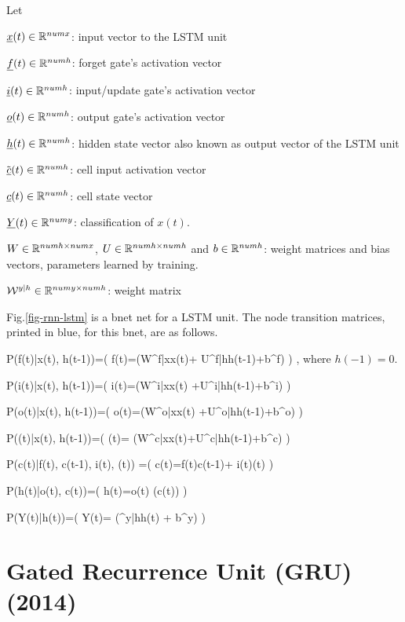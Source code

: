 Let

${\underline{x}}(t)\in { \mathbb{R}}^{numx}$: 
input vector to the LSTM unit

${\underline{f}}(t)\in { \mathbb{R}}^{numh}$:
forget gate's activation vector

${\underline{i}}(t)\in { \mathbb{R}}^{numh}$: 
input/update gate's activation vector

${\underline{o}}(t)\in { \mathbb{R}}^{numh}$: 
output gate's activation vector

${\underline{h}}(t)\in { \mathbb{R}}^{numh}$: 
hidden state vector also known as
 output vector of the LSTM unit

${\tilde {{\underline{c}}}}(t)\in { \mathbb{R}}^{numh}$: 
cell input activation vector

${\underline{c}}(t)\in { \mathbb{R}}^{numh}$: 
cell state vector

${\underline{Y}}(t)\in { \mathbb{R}}^{numy}$: 
classification of $x(t)$.

$W\in { \mathbb{R}}^{numh\times numx}$, 
$U\in { \mathbb{R}}^{numh\times numh}$
and 
$b\in { \mathbb{R}}^{numh}$: 
weight matrices and bias vectors,
 parameters learned by training.

${\cal W}^{y|h}\in { \mathbb{R}}^{numy\times numh}$:
 weight matrix


Fig.\ref{fig-rnn-lstm}
is a bnet net
for a LSTM unit.
The node transition matrices, printed in blue,
for this bnet, are
as follows.

\beq\color{blue}
P(f(t)|x(t), h(t-1))=\indi(\;\;\;
f(t)=\sigma(W^{f|x}x(t)+
U^{f|h}h(t-1)+b^{f})
\;\;\;)
\;,
\eeq
where $h(-1)=0$.

\beq\color{blue}
P(i(t)|x(t), h(t-1))=\indi(\;\;\;
i(t)=\sigma(W^{i|x}x(t)
+U^{i|h}h(t-1)+b^{i})
\;\;\;)
\eeq

\beq\color{blue}
P(o(t)|x(t), h(t-1))=\indi(\;\;\;
o(t)=\sigma(W^{o|x}x(t)
+U^{o|h}h(t-1)+b^{o})
\;\;\;)
\eeq

\beq\color{blue}
P((t)|x(t), h(t-1))=\indi(\;\;\;
(t)=\tanh
(W^{c|x}x(t)+U^{c|h}h(t-1)+b^{c})
\;\;\;)
\eeq

\beq\color{blue}
P(c(t)|f(t), c(t-1), i(t),
 (t))
=\indi(\;\;\;
c(t)=f(t)\odot c(t-1)+
i(t)(t)
\;\;\;)
\eeq

\beq\color{blue}
P(h(t)|o(t), c(t))=\indi(\;\;\;
h(t)=o(t)\odot \tanh
(c(t))
\;\;\;)
\eeq



\beq\color{blue}
P(Y(t)|h(t))=\indi(\;\;\;
Y(t)= \cala(\calw^{y|h}h(t) + b^y)
\;\;\;)
\eeq

\newpage
\section*{Gated Recurrence Unit
 (GRU) (2014)}


